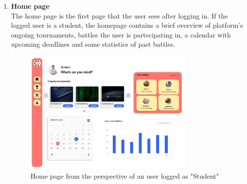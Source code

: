 \begin{enumerate}[label=\textbf{F\arabic*)}]
    \item \textbf{Home page}\\
    The home page is the first page that the user sees after logging in. If the logged user is a student, the homepage contains a brief overview of platform's ongoing tournaments, battles the user is partecipating in, a calendar with upcoming deadlines and some statistics of past battles. \\
    \begin{figure}[H]
        \centering
        \includegraphics[width=0.8\textwidth]{Mockups/3_student_homepage.png}
        \caption{Home page from the perspective of an user logged as "Student"}
    \end{figure}


\end{enumerate}
